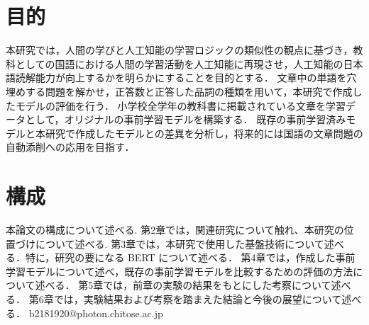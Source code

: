 \documentclass[12pt, a4paper]{ujreport} %
\begin{document}
\section{目的}
本研究では，人間の学びと人工知能の学習ロジックの類似性の観点に基づき，教科としての国語における人間の学習活動を人工知能に再現させ，人工知能の日本語読解能力が向上するかを明らかにすることを目的とする．
文章中の単語を穴埋めする問題を解かせ，正答数と正答した品詞の種類を用いて，本研究で作成したモデルの評価を行う．
小学校全学年の教科書に掲載されている文章を学習データとして，オリジナルの事前学習モデルを構築する．
既存の事前学習済みモデルと本研究で作成したモデルとの差異を分析し，将来的には国語の文章問題の自動添削への応用を目指す．

\section{構成}
本論文の構成について述べる.
第2章では，関連研究について触れ、本研究の位置づけについて述べる.
第3章では，本研究で使用した基盤技術について述べる．特に，研究の要になる BERT について述べる．
第4章では，作成した事前学習モデルについて述べ，既存の事前学習モデルを比較するための評価の方法について述べる．
第5章では，前章の実験の結果をもとにした考察について述べる．
第6章では，実験結果および考察を踏まえた結論と今後の展望について述べる．
\textsf{b2181920@photon.chitose.ac.jp}
\end{document}
